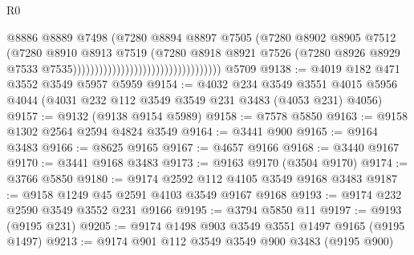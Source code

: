 \begin{lexlean}{R0}
\begin{coremodule}
                                                              @8886
                                                              @8889
                                                              @7498
                                                              (@7280
                                                                @8894
                                                                @8897
                                                                @7505
                                                                (@7280
                                                                  @8902
                                                                  @8905
                                                                  @7512
                                                                  (@7280
                                                                    @8910
                                                                    @8913
                                                                    @7519
                                                                    (@7280
                                                                      @8918
                                                                      @8921
                                                                      @7526
                                                                      (@7280
                                                                        @8926
                                                                        @8929
                                                                        @7533
                                                                        @7535))))))))))))))))))))))))))))))))))
    @5709
@9138 := @4019 @182 @471 @3552 @3549 @5957 @5959
@9154 := @4032
    @234
    @3549
    @3551
    @4015
    @5956
    @4044
    (@4031 @232 @112 @3549 @3549 @231 @3483 (@4053 @231) @4056)
@9157 := @9132 (@9138 @9154 @5989)
@9158 := @7578 @5850
@9163 := @9158 @1302 @2564 @2594 @4824 @3549
@9164 := @3441 @900
@9165 := @9164 @3483
@9166 := @8625 @9165
@9167 := @4657 @9166
@9168 := @3440 @9167
@9170 := @3441 @9168 @3483
@9173 := @9163 @9170 (@3504 @9170)
@9174 := @3766 @5850
@9180 := @9174 @2592 @112 @4105 @3549 @9168 @3483
@9187 := @9158 @1249 @45 @2591 @4103 @3549 @9167 @9168
@9193 := @9174 @232 @2590 @3549 @3552 @231 @9166
@9195 := @3794 @5850 @11
@9197 := @9193 (@9195 @231)
@9205 := @9174 @1498 @903 @3549 @3551 @1497 @9165 (@9195 @1497)
@9213 := @9174 @901 @112 @3549 @3549 @900 @3483 (@9195 @900)

\end{coremodule}
\end{lexlean}
